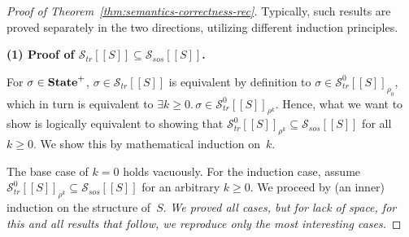 \documentclass[10pt,a4paper]{amsart}
\theoremstyle{definition}
\newcommand{\config}[2]{\left< #1, #2 \right>}
\newcommand{\denot}[1]{\left[\!\left[#1\right]\!\right]}
\newcommand{\trcdenot}[1]{\mathcal{S}_{\mathit{tr}}\!\denot{#1}}
\newcommand{\trcdenoth}[1]{\mathcal{S}^0_{\mathit{tr}}\!\denot{#1}}
\newcommand{\sosdenot}[1]{\mathcal{S}_{\mathit{sos}}\!\denot{#1}}
\newcommand{\State}{\mbox{\bf State}}
\begin{document}
\begin{proof}[Proof of Theorem~\ref{thm:semantics-correctness-rec}]
  
Typically, such results are proved separately in the two directions,
utilizing different induction principles.

\noindent\textbf{(1) Proof of $\trcdenot{S} \subseteq \sosdenot{S}$.}

For $\sigma \in \State^+$,
%
$\sigma \in \trcdenot{S}$ is equivalent by definition to
$\sigma \in \trcdenoth{S}_{\rho_0}$, which in turn is equivalent to
$\exists k \geq 0.\, \sigma \in \trcdenoth{S}_{\rho^k}$.
%
Hence, what we want to show is logically equivalent to showing that 
$\trcdenoth{S}_{\rho^k} \subseteq \sosdenot{S}$ for all $k \geq 0$. 
%
We show this by mathematical induction on~$k$.

The base case of $k = 0$ holds vacuously.
%
For the induction case, assume 
$\trcdenoth{S}_{\rho^k} \subseteq \sosdenot{S}$ for an
arbitrary $k \geq 0$.
%
We proceed by (an inner) induction on the structure of~$S$.
%
\emph{We proved all cases, but for lack of space, for this and all
  results that follow, we reproduce only the most interesting cases.}

\end{proof}
\end{document}
